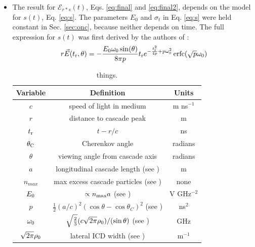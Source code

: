 \documentclass[amsmath,amssymb,aps,prd,10pt,twocolumn,showkeys]{revtex4}
\DeclareMathOperator\erfc{erfc}
\begin{document}
\begin{itemize}
\item The result for $\mathcal{E}_{r*s}(t)$, Eqs. \ref{eq:final} and \ref{eq:final2}, depends on the model for $s(t)$, Eq. \ref{eq:s}.  The parameters $E_0$ and $\sigma_t$ in Eq. \ref{eq:s} were held constant in Sec. \ref{sec:onc}, because neither depends on time.  The full expression for $s(t)$ was first derived by the authors of \cite{PhysRevD.105.123019}:
\begin{equation}
r\vec{E}(t_{\rm r},\theta) = -\frac{E_0\omega_0 \sin(\theta)}{8\pi p}t_{\rm r}e^{-\frac{t_{\rm r}^2}{4p}+p\omega_0^2}\erfc(\sqrt{p}\omega_0) \label{eq:s_full}
\end{equation}
\begin{table}
\small
\begin{tabular}{| c | c | c |} \hline
\textbf{Variable} & \textbf{Definition} & \textbf{Units}\\ \hline
$c$ & speed of light in medium & m ns$^{-1}$ \\ 
$r$ & distance to cascade peak & m \\
$t_{\rm r}$ & $t-r/c$ & ns \\
$\theta_{\rm C}$ & Cherenkov angle & radians \\ 
$\theta$ & viewing angle from cascade axis & radians \\ 
$a$ & longitudinal cascade length (see \cite{10.1103/physrevd.65.016003}) & m \\ 
$n_{max}$ & max excess cascade particles (see \cite{10.1103/physrevd.65.016003})  & none \\
$E_{\rm 0}$ & $\propto n_{\rm max}a$ (see \cite{10.1103/physrevd.65.016003}) & V GHz$^{-2}$ \\
$p$ & $\frac{1}{2}(a/c)^2 \left(\cos\theta - \cos\theta_C\right)^2$ (see \cite{PhysRevD.105.123019}) & ns$^2$ \\ 
$\omega_{\rm 0}$ & $\sqrt{\frac{2}{3}} (c\sqrt{2\pi}\rho_{\rm 0})/(\sin\theta)$ (see \cite{10.1016/j.astropartphys.2017.03.008}) & GHz \\
$\sqrt{2\pi}\rho_{\rm 0}$ & lateral ICD width (see \cite{10.1016/j.astropartphys.2017.03.008}) & m$^{-1}$ \\ \hline
\end{tabular}
\caption{\label{tab:param} things.}
\end{table}


\end{itemize}
\end{document}
